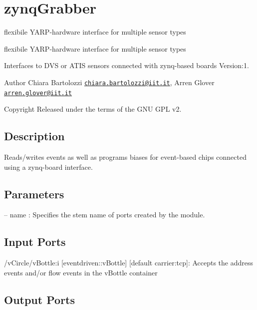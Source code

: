 \hypertarget{group__zynqGrabber}{}\section{zynq\+Grabber}
\label{group__zynqGrabber}


flexibile Y\+A\+R\+P-\/hardware interface for multiple sensor types  


flexibile Y\+A\+R\+P-\/hardware interface for multiple sensor types 

Interfaces to D\+VS or A\+T\+IS sensors connected with zynq-\/based boards Version\+:1. \begin{DoxyAuthor}{Author}
Chiara Bartolozzi \href{mailto:chiara.bartolozzi@iit.it}{\tt chiara.\+bartolozzi@iit.\+it}, Arren Glover \href{mailto:arren.glover@iit.it}{\tt arren.\+glover@iit.\+it} ~\newline
 
\end{DoxyAuthor}
\begin{DoxyCopyright}{Copyright}
Released under the terms of the G\+NU G\+PL v2. 
\end{DoxyCopyright}
\hypertarget{group__vUndistortCam_intro_sec}{}\subsection{Description}\label{group__vUndistortCam_intro_sec}
Reads/writes events as well as programs biases for event-\/based chips connected using a zynq-\/board interface.\hypertarget{group__vUndistortCam_parameters_sec}{}\subsection{Parameters}\label{group__vUndistortCam_parameters_sec}

\begin{DoxyItemize}
\item -- name \+: Specifies the stem name of ports created by the module. 
\end{DoxyItemize}\hypertarget{group__vUndistortCam_inputports_sec}{}\subsection{Input Ports}\label{group__vUndistortCam_inputports_sec}

\begin{DoxyItemize}
\item /v\+Circle/v\+Bottle\+:i \mbox{[}eventdriven\+::v\+Bottle\mbox{]} \mbox{[}default carrier\+:tcp\mbox{]}\+: Accepts the address events and/or flow events in the v\+Bottle container
\end{DoxyItemize}\hypertarget{group__vUndistortCam_outputports_sec}{}\subsection{Output Ports}\label{group__vUndistortCam_outputports_sec}

